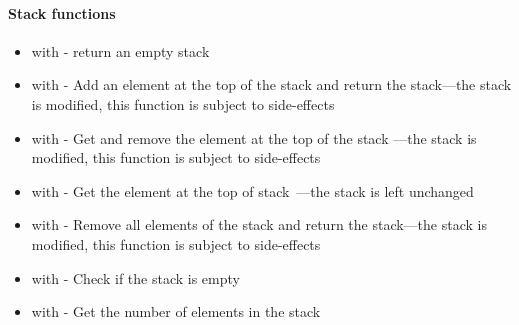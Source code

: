 \paragraph{Stack functions}

\begin{itemize}
	\item {} with  - return an empty stack
	\item \label{item:lbl-stack_push}  with  - Add an element  at the top of the stack  and return the stack---the stack is modified, this function is subject to side-effects
	\item \label{item:lbl-stack_pop}  with  - Get and remove the element at the top of the stack ---the stack is modified, this function is subject to side-effects
	\item \label{item:lbl-stack_top}  with  - Get the element at the top of stack~---the stack is left unchanged
	\item \label{item:lbl-stack_clear}  with  - Remove all elements of the stack  and return the stack---the stack is modified, this function is subject to side-effects
	\item \label{item:lbl-stack_is_empty}  with  - Check if the stack  is empty
	\item \label{item:lbl-stack_length}  with  - Get the number of elements in the stack 
\end{itemize}


